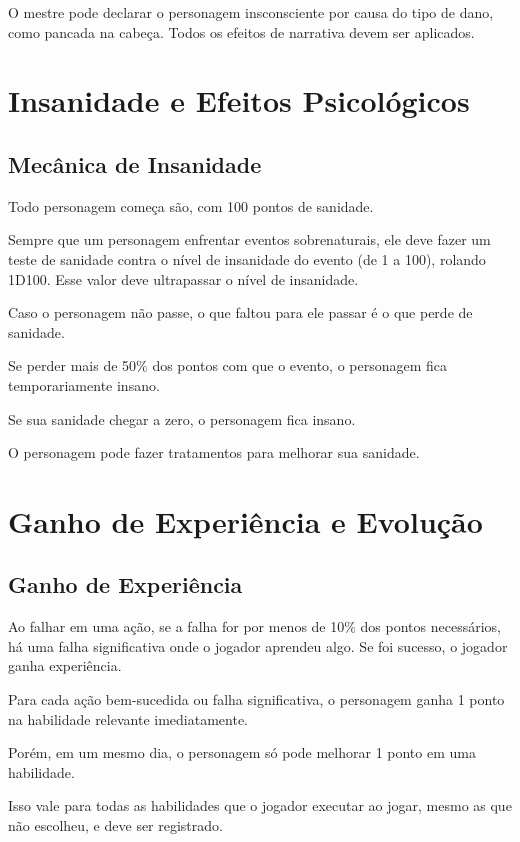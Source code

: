 \documentclass[a4paper,12pt]{book}
\begin{document}
O mestre pode declarar o personagem insconsciente por causa do tipo de dano, como pancada na cabeça. Todos os efeitos de narrativa devem ser aplicados.

\chapter{Insanidade e Efeitos Psicológicos}

\section{Mecânica de Insanidade}

Todo personagem começa são, com 100 pontos de sanidade.

Sempre que um personagem enfrentar eventos sobrenaturais, ele deve fazer um teste de sanidade contra o nível de insanidade do evento (de 1 a 100), rolando 1D100. Esse valor deve ultrapassar o nível de insanidade.

Caso o personagem não passe, o que faltou para ele passar é o que perde de sanidade.



Se perder mais de 50\% dos pontos com que o evento, o personagem fica temporariamente insano.

Se sua sanidade chegar a zero, o personagem fica insano.

O personagem pode fazer tratamentos para melhorar sua sanidade.



\chapter{Ganho de Experiência e Evolução}

\section{Ganho de Experiência}

Ao falhar em uma ação, se a falha for por menos de 10\%  dos pontos necessários, há uma falha significativa onde o jogador aprendeu algo. Se foi sucesso, o jogador ganha experiência.

Para cada ação bem-sucedida ou falha significativa, o personagem ganha 1 ponto  na habilidade relevante imediatamente.

Porém, em um mesmo dia, o personagem só pode melhorar 1 ponto em uma habilidade.

Isso vale para todas as habilidades que o jogador executar ao jogar, mesmo as que não escolheu, e deve ser registrado.
\end{document}
